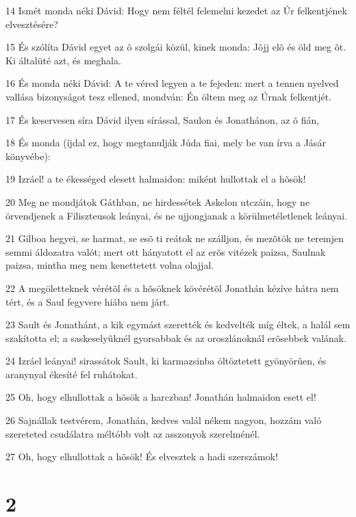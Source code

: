\par 14 Ismét monda néki Dávid: Hogy nem féltél felemelni kezedet az Úr felkentjének elvesztésére?
\par 15 És szólíta Dávid egyet az õ szolgái közül, kinek monda: Jõjj elõ és öld meg õt. Ki általüté azt, és meghala.
\par 16 És monda néki Dávid: A te véred legyen a te fejeden: mert a tennen nyelved vallása bizonyságot tesz ellened, mondván: Én öltem meg az Úrnak felkentjét.
\par 17 És keservesen síra Dávid ilyen sírással, Saulon és Jonathánon, az õ fián,
\par 18 És monda (íjdal ez, hogy megtanulják Júda fiai, mely be van írva a Jásár könyvébe):
\par 19 Izráel! a te ékességed elesett halmaidon: miként hullottak el a hõsök!
\par 20 Meg ne mondjátok Gáthban, ne hirdessétek Askelon utczáin, hogy ne örvendjenek a Filiszteusok leányai, és ne ujjongjanak a körülmetéletlenek leányai.
\par 21 Gilboa hegyei, se harmat, se esõ ti reátok ne szálljon, és mezõtök ne teremjen semmi áldozatra valót; mert ott hányatott el az erõs vitézek paizsa, Saulnak paizsa, mintha meg nem kenettetett volna  olajjal.
\par 22 A megöletteknek vérétõl és a hõsöknek kövérétõl Jonathán kézíve hátra nem tért, és a Saul fegyvere hiába nem járt.
\par 23 Sault és Jonathánt, a kik egymást szerették és kedvelték míg éltek, a halál sem szakította el; a saskeselyûknél gyorsabbak és az oroszlánoknál erõsebbek valának.
\par 24 Izráel leányai! sirassátok Sault, ki karmazsinba öltöztetett gyönyörûen, és aranynyal ékesíté fel ruhátokat.
\par 25 Oh, hogy elhullottak a hõsök a harczban! Jonathán halmaidon esett el!
\par 26 Sajnállak testvérem, Jonathán, kedves valál nékem nagyon, hozzám való szereteted csudálatra méltóbb volt az asszonyok szerelménél.
\par 27 Oh, hogy elhullottak a hõsök! És elvesztek a hadi szerszámok!

\chapter{2}

